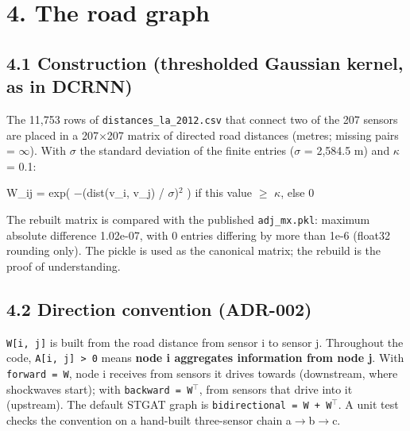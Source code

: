 \documentclass[10pt,a4paper]{article}
\begin{document}
\clearpage
\section*{4. The road graph}
\subsection*{4.1 Construction (thresholded Gaussian kernel, as in DCRNN)}
The 11,753 rows of \texttt{distances\_\allowbreak{}la\_\allowbreak{}2012.csv} that connect two of the 207 sensors are placed in a 207\ensuremath{\times}207 matrix of directed road distances (metres; missing pairs = \ensuremath{\infty}). With \ensuremath{\sigma} the standard deviation of the finite entries (\ensuremath{\sigma} = 2,584.5 m) and \ensuremath{\kappa} = 0.1:

\begin{eqbox}W\_\allowbreak{}ij = exp( \ensuremath{-}(dist(v\_\allowbreak{}i, v\_\allowbreak{}j) /\allowbreak{} \ensuremath{\sigma})\ensuremath{^{2}} )   if this value \ensuremath{\geq} \ensuremath{\kappa},   else 0\end{eqbox}

The rebuilt matrix is compared with the published \texttt{adj\_\allowbreak{}mx.pkl}: maximum absolute difference 1.02e-07, with 0 entries differing by more than 1e-6 (float32 rounding only). The pickle is used as the canonical matrix; the rebuild is the proof of understanding.

\subsection*{4.2 Direction convention (ADR-002)}
\texttt{W[i, j]} is built from the road distance from sensor i to sensor j. Throughout the code, \texttt{A[i, j] > 0} means \textbf{node i aggregates information from node j}. With \texttt{forward = W}, node i receives from sensors it drives towards (downstream, where shockwaves start); with \texttt{backward = W\ensuremath{^{\top}}}, from sensors that drive into it (upstream). The default STGAT graph is \texttt{bidirectional = W + W\ensuremath{^{\top}}}. A unit test checks the convention on a hand-built three-sensor chain a\ensuremath{\rightarrow}b\ensuremath{\rightarrow}c.
\end{document}

